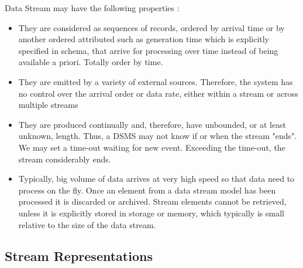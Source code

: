 Data Stream may have the following properties \citep{Golab:2010}:
\begin{itemize}
	\item They are considered as sequences of records, ordered by arrival time or by another ordered attributed such as generation time which is explicitly specified in schema, that arrive for processing over time instead of being available a priori. Totally order by time. 
	\item They are emitted by a variety of external sources. Therefore, the system has no control over the arrival order or data rate, either within a stream or across multiple streams
	\item They are produced continually and, therefore, have unbounded, or at least unknown, length. Thus, a DSMS may not know if or when the stream "ends". We may set a time-out waiting for new event. Exceeding the time-out, the stream considerably ends. 
	\item Typically, big volume of data arrives at very high speed so that data need to process on the fly. Once an element from a data stream model has been processed it is discarded or archived. Stream elements cannot be retrieved, unless it is explicitly stored in storage or memory, which typically is small relative to the size of the data stream. \citep{Babcock:2002}
	
\end{itemize}


\subsection*{Stream Representations}
